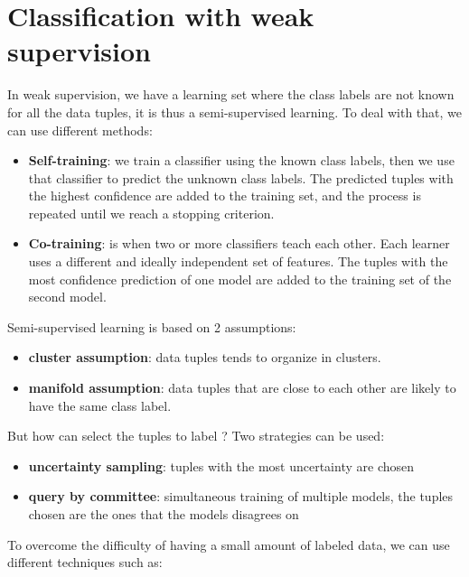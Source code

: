 \documentclass[12pt, openany]{report}
\theoremstyle{definition}
\begin{document}
\section{Classification with weak supervision}
In weak supervision, we have a learning set where the class labels are not known for all the data tuples, it is thus a semi-supervised learning. To deal with that, we can use different methods:
\begin{itemize}
    \item \textbf{Self-training}: we train a classifier using the known class labels, then we use that classifier to predict the unknown class labels. The predicted tuples with the highest confidence are added to the training set, and the process is repeated until we reach a stopping criterion.
    \item \textbf{Co-training}: is when two or more classifiers teach each other. Each learner uses a different and ideally independent set of features. The tuples with the most confidence prediction of one model are added to the training set of the second model.
\end{itemize}
Semi-supervised learning is based on 2 assumptions:
\begin{itemize}
    \item \textbf{cluster assumption}: data tuples tends to organize in clusters.
    \item \textbf{manifold assumption}: data tuples that are close to each other are likely to have the same class label.
\end{itemize}
But how can select the tuples to label ? Two strategies can be used:
\begin{itemize}
    \item \textbf{uncertainty sampling}: tuples with the most uncertainty are chosen
    \item \textbf{query by committee}: simultaneous training of multiple models,  the tuples chosen are the ones that the models disagrees on
\end{itemize}
To overcome the difficulty of having a small amount of labeled data, we can use different techniques such as:
\end{document}
